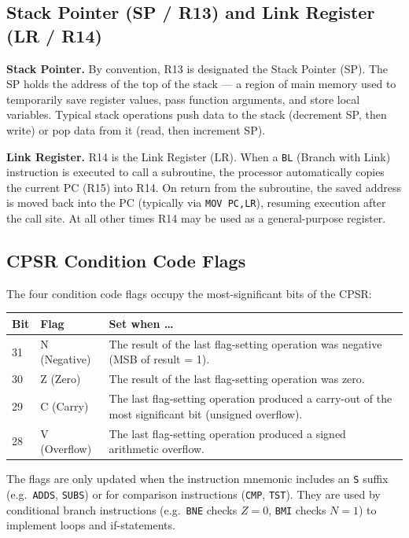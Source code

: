 \documentclass[11pt, a4paper, notitlepage]{report}
\theoremstyle{definition}
\theoremstyle{remark}
\theoremstyle{definition}
\begin{document}
\subsection{Stack Pointer (SP / R13) and Link Register (LR / R14)}

\textbf{Stack Pointer.} By convention, R13 is designated the Stack Pointer (SP). The SP holds the address of the top of the stack --- a region of main memory used to temporarily save register values, pass function arguments, and store local variables. Typical stack operations push data to the stack (decrement SP, then write) or pop data from it (read, then increment SP).

\textbf{Link Register.} R14 is the Link Register (LR). When a \texttt{BL} (Branch with Link) instruction is executed to call a subroutine, the processor automatically copies the current PC (R15) into R14. On return from the subroutine, the saved address is moved back into the PC (typically via \texttt{MOV PC,LR}), resuming execution after the call site. At all other times R14 may be used as a general-purpose register.

\subsection{CPSR Condition Code Flags}

The four condition code flags occupy the most-significant bits of the CPSR:

\begin{center}
\begin{tabularx}{\textwidth}{llX}
\toprule
\textbf{Bit} & \textbf{Flag} & \textbf{Set when \ldots} \\
\midrule
31 & N (Negative) & The result of the last flag-setting operation was negative (MSB of result = 1). \\
30 & Z (Zero) & The result of the last flag-setting operation was zero. \\
29 & C (Carry) & The last flag-setting operation produced a carry-out of the most significant bit (unsigned overflow). \\
28 & V (Overflow) & The last flag-setting operation produced a signed arithmetic overflow. \\
\bottomrule
\end{tabularx}
\end{center}

The flags are only updated when the instruction mnemonic includes an \texttt{S} suffix (e.g.\ \texttt{ADDS}, \texttt{SUBS}) or for comparison instructions (\texttt{CMP}, \texttt{TST}). They are used by conditional branch instructions (e.g.\ \texttt{BNE} checks $Z = 0$, \texttt{BMI} checks $N = 1$) to implement loops and if-statements.
\end{document}
